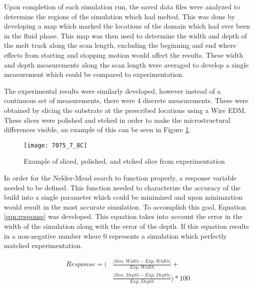 \label{sim_analysis}

Upon completion of each simulation run, the saved data files were analyzed to determine the regions of the simulation which had melted.  This was done by developing a map which marked the locations of the domain which had ever been in the fluid phase.  This map was then used to determine the width and depth of the melt track along the scan length, excluding the beginning and end where effects from starting and stopping motion would affect the results.  These width and depth measurements along the scan length were averaged to develop a single measurement which could be compared to experimentation.  

The experimental results were similarly developed, however instead of a continuous set of measurements, there were 4 discrete measurements.  These were obtained by slicing the substrate at the prescribed locations using a Wire \ac{EDM}.  These slices were polished and etched in order to make the microstructural differences visible, an example of this can be seen in Figure \ref{fig:7075_7_8C}.
\begin{figure}[!htb]
	\centering
	\texttt{[image: 7075\_7\_8C]}
	\caption{Example of sliced, polished, and etched slice from experimentation}
	\label{fig:7075_7_8C}
\end{figure}

In order for the Nelder-Mead search to function properly, a response variable needed to be defined.  This function needed to characterize the accuracy of the build into a single parameter which could be minimized and upon minimzation would result in the most accurate simulation.  To accomplish this goal, Equation \ref{eqn:response} was developed.  This equation takes into account the error in the width of the simulation along with the error of the depth.  If this equation results in a non-negative number where 0 represents a simulation which perfectly matched experimentation.

\begin{equation}\label{eqn:response}
	\begin{split}
		Response =  \Biggl ( &\frac{\lvert Sim.\ Width - Exp.\ Width \rvert}{Exp.\ Width} + \\ 
		&\frac{\lvert Sim.\ Depth - Exp.\ Depth \rvert}{Exp.\ Depth} \Biggr ) * 100
	\end{split}
\end{equation}